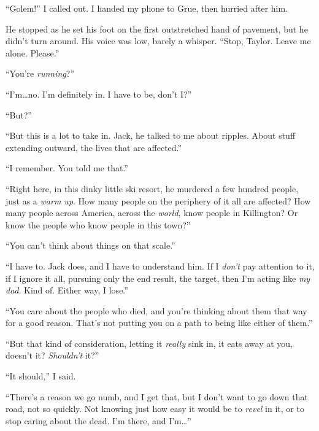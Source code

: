 ``Golem!'' I called out.  I handed my phone to Grue, then hurried after him.



He stopped as he set his foot on the first outstretched hand of pavement, but he didn't turn around.  His voice was low, barely a whisper.  ``Stop, Taylor.  Leave me alone.  Please.''



``You're \emph{running}?''



``I'm\ldots no.  I'm definitely in.  I have to be, don't I?''



``But?''



``But this is a lot to take in.  Jack, he talked to me about ripples.  About stuff extending outward, the lives that are affected.''



``I remember.  You told me that.''



``Right here, in this dinky little ski resort, he murdered a few hundred people, just as a \emph{warm up}.  How many people on the periphery of it all are affected?  How many people across America, across the \emph{world}, know people in Killington?  Or know the people who know people in this town?''



``You can't think about things on that scale.''



``I have to.  Jack does, and I have to understand him.  If I \emph{don't }pay attention to it, if I ignore it all, pursuing only the end result, the target, then I'm acting like \emph{my dad}.  Kind of.  Either way, I lose.''



``You care about the people who died, and you're thinking about them that way for a good reason.  That's not putting you on a path to being like either of them.''



``But that kind of consideration, letting it \emph{really} sink in, it eats away at you, doesn't it?  \emph{Shouldn't} it?''



``It should,'' I said.



``There's a reason we go numb, and I get that, but I don't want to go down that road, not so quickly.  Not knowing just how easy it would be to \emph{revel} in it, or to stop caring about the dead.  I'm there, and I'm\ldots''



